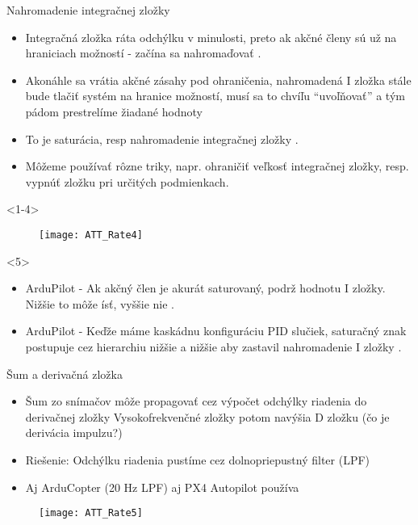 \begin{frame}[t]{Nahromadenie integračnej zložky}
  \begin{itemize}
    \item<1-3> Integračná zložka ráta odchýlku v minulosti, preto ak akčné členy sú už na hraniciach možností - začína sa nahromaďovať .
    \item<2-3> Akonáhle sa vrátia akčné zásahy pod ohraničenia, nahromadená I zložka stále bude tlačiť systém na hranice možností, musí sa to chvíľu ``uvoľňovať''  a tým pádom prestrelíme  žiadané hodnoty
    \item<3> To je saturácia, resp nahromadenie integračnej zložky .
    \item<4-> Môžeme používať rôzne triky, napr. ohraničiť veľkosť integračnej zložky, resp. vypnúť zložku pri určitých podmienkach.
  \end{itemize}
      \begin{onlyenv}<1-4>
  \begin{figure}
\centering
  \texttt{[image: ATT\_Rate4]}\\
\end{figure}
\end{onlyenv}

      \begin{onlyenv}<5>
        \begin{itemize}
  \item<1-> ArduPilot - Ak akčný člen je akurát saturovaný, podrž hodnotu I zložky. Nižšie to môže ísť, vyššie nie \citep{AP:PID}.
  \item<2-> ArduPilot - Keďže máme kaskádnu konfiguráciu PID slučiek, saturačný znak postupuje cez hierarchiu nižšie a nižšie aby zastavil nahromadenie I zložky \citep{AP:PID}.
            \end{itemize}
      \end{onlyenv}

\end{frame}



\begin{frame}[t]{Šum a derivačná zložka}
  \begin{itemize}
    \item<1-> Šum zo snímačov môže propagovať cez výpočet odchýlky riadenia do derivačnej zložky Vysokofrekvenčné zložky potom navýšia D zložku (čo je derivácia impulzu?)
    \item<2-> Riešenie: Odchýlku riadenia pustíme cez dolnopriepustný  filter (LPF) 
    \item<3->  Aj ArduCopter (20 Hz LPF) aj PX4 Autopilot používa \citep{AP:PID,PX4:PID}
  \end{itemize}

  \begin{figure}
\centering
  \texttt{[image: ATT\_Rate5]}\\
\end{figure}

\end{frame}




